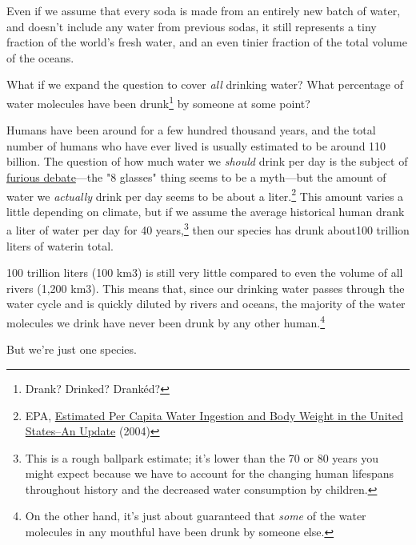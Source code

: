 {{Even if we assume that every soda is made from an entirely new batch of water, and doesn't include any water from previous sodas, it still represents a tiny fraction of the world's fresh water, and an even tinier fraction of the total volume of the oceans.}

{What if we expand the question to cover \emph{all} drinking water? What percentage of water molecules have been drunk{\footnote{Drank? Drinked? Drankéd?} } by someone at some point?}

{Humans have been around for a few hundred thousand years, and the total number of humans who have ever lived is usually estimated to be around 110 billion. The question of how much water we \emph{should} drink per day is the subject of \href{https://www.google.com/search?q=glasses+of+water+per+day}{furious debate}—the "8 glasses" thing seems to be a myth—but the amount of water we \emph{actually} drink per day seems to be about a liter.{\footnote{EPA, \href{http://water.epa.gov/action/advisories/drinking/upload/2005\_05\_06\_criteria\_drinking\_percapita\_2004.pdf}{Estimated Per Capita Water Ingestion and Body Weight in the United States–An Update} (2004)} } This amount varies a little depending on climate, but if we assume the average historical human drank a liter of water per day for 40 years,{\footnote{This is a rough ballpark estimate; it's lower than the 70 or 80 years you might expect because we have to account for the changing human lifespans throughout history and the decreased water consumption by children.} } then our species has drunk about100 trillion liters of waterin total.}

{100 trillion liters (100 km3) is still very little compared to even the volume of all rivers (1,200 km3). This means that, since our drinking water passes through the water cycle and is quickly diluted by rivers and oceans, the majority of the water molecules we drink have never been drunk by any other human.{\footnote{On the other hand, it's just about guaranteed that \emph{some} of the water molecules in any mouthful have been drunk by someone else.} } }

{But we're just one species.}

}
